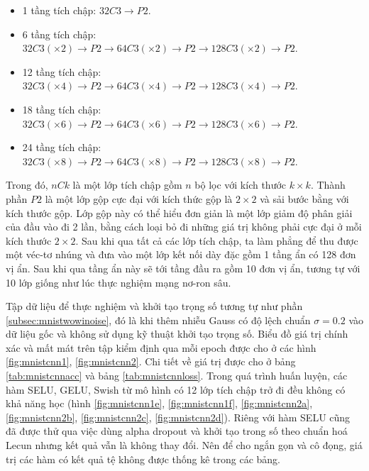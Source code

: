 \begin{itemize}
    \item 1 tầng tích chập: $32C3 \rightarrow P2$.
    \item 6 tầng tích chập: $32C3(\times 2) \rightarrow P2 \rightarrow 64C3(\times 2) \rightarrow P2 \rightarrow 128C3(\times 2) \rightarrow P2$.
    \item 12 tầng tích chập: $32C3(\times 4) \rightarrow P2 \rightarrow 64C3(\times 4) \rightarrow P2 \rightarrow 128C3(\times 4) \rightarrow P2$.
    \item 18 tầng tích chập: $32C3(\times 6) \rightarrow P2 \rightarrow 64C3(\times 6) \rightarrow P2 \rightarrow 128C3(\times 6) \rightarrow P2$.
    \item 24 tầng tích chập: $32C3(\times 8) \rightarrow P2 \rightarrow 64C3(\times 8) \rightarrow P2 \rightarrow 128C3(\times 8) \rightarrow P2$.
\end{itemize}

Trong đó, $nCk$ là một lớp tích chập gồm $n$ bộ lọc với kích thước $k \times k$.
Thành phần $P2$ là một lớp gộp cực đại với kích thức gộp là $2 \times 2$ và sải bước bằng với kích thước gộp.
Lớp gộp này có thể hiểu đơn giản là một lớp giảm độ phân giải của đầu vào đi 2 lần, bằng cách loại bỏ đi những giá trị không phải cực đại ở mỗi kích thước $2 \times 2$.
Sau khi qua tất cả các lớp tích chập, ta làm phẳng để thu được một véc-tơ nhúng và đưa vào một lớp kết nối dày đặc gồm 1 tầng ẩn có 128 đơn vị ẩn.
Sau khi qua tầng ẩn này sẽ tới tầng đầu ra gồm 10 đơn vị ẩn, tương tự với 10 lớp giống như lúc thực nghiệm mạng nơ-ron sâu.
\vspace{5pt}

Tập dữ liệu để thực nghiệm và khởi tạo trọng số tương tự như phần \ref{subsec:mnistwowinoise}, đó là khi thêm nhiễu Gauss có độ lệch chuẩn $\sigma = 0.2$ vào dữ liệu gốc và không sử dụng kỹ thuật khởi tạo trọng số.
Biểu đồ giá trị chính xác và mất mát trên tập kiểm định qua mỗi epoch được cho ở các hình \ref{fig:mnistcnn1}, \ref{fig:mnistcnn2}.
Chi tiết về giá trị được cho ở bảng \ref{tab:mnistcnnacc} và bảng \ref{tab:mnistcnnloss}.
Trong quá trình huấn luyện, các hàm SELU, GELU, Swish từ mô hình có 12 lớp tích chập trở đi đều không có khả năng học (hình \ref{fig:mnistcnn1e}, \ref{fig:mnistcnn1f}, \ref{fig:mnistcnn2a}, \ref{fig:mnistcnn2b}, \ref{fig:mnistcnn2c}, \ref{fig:mnistcnn2d}).
Riêng với hàm SELU cũng đã được thử qua việc dùng alpha dropout và khởi tạo trong số theo chuẩn hoá Lecun nhưng kết quả vẫn là không thay đổi.
Nên để cho ngắn gọn và cô đọng, giá trị các hàm có kết quả tệ không được thống kê trong các bảng.

